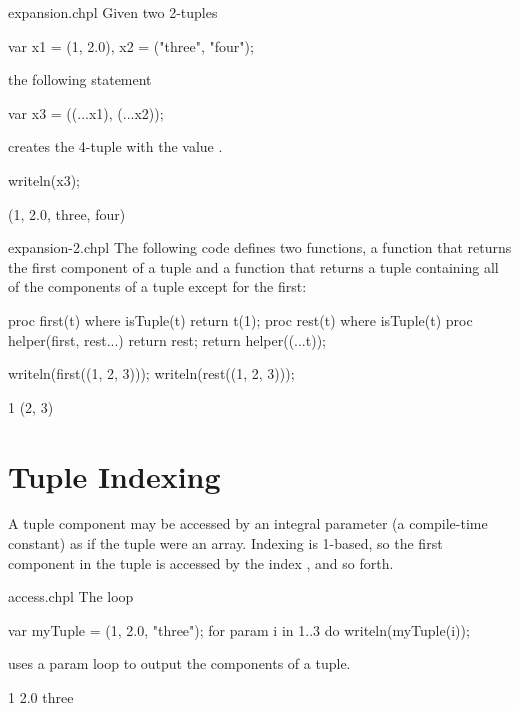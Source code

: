 \begin{chapelexample}{expansion.chpl}
Given two 2-tuples
\begin{chapel}
var x1 = (1, 2.0), x2 = ("three", "four");
\end{chapel}
the following statement
\begin{chapel}
var x3 = ((...x1), (...x2));
\end{chapel}
creates the 4-tuple  with the value .
\begin{chapelpost}
writeln(x3);
\end{chapelpost}
\begin{chapeloutput}
(1, 2.0, three, four)
\end{chapeloutput}
\end{chapelexample}

\begin{chapelexample}{expansion-2.chpl}
The following code defines two functions, a function  that
returns the first component of a tuple and a function  that
returns a tuple containing all of the components of a tuple except for
the first:
\begin{chapel}
proc first(t) where isTuple(t) {
  return t(1);
}
proc rest(t) where isTuple(t) {
  proc helper(first, rest...)
    return rest;
  return helper((...t));
}
\end{chapel}
\begin{chapelpost}
writeln(first((1, 2, 3)));
writeln(rest((1, 2, 3)));
\end{chapelpost}
\begin{chapeloutput}
1
(2, 3)
\end{chapeloutput}
\end{chapelexample}

\section{Tuple Indexing}
\label{Tuple_Indexing}

A tuple component may be accessed by an integral parameter (a compile-time
constant) as if the tuple were an array.  Indexing is 1-based, so the
first component in the tuple is accessed by the index , and so
forth.

\begin{chapelexample}{access.chpl}
The loop
\begin{chapel}
var myTuple = (1, 2.0, "three");
for param i in 1..3 do
  writeln(myTuple(i));
\end{chapel}
uses a param loop to output the components of a tuple.
\begin{chapelpost}
\end{chapelpost}
\begin{chapeloutput}
1
2.0
three
\end{chapeloutput}
\end{chapelexample}

